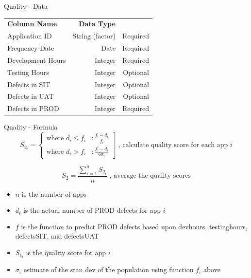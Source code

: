 \begin{frame}{Quality - Data}
    
    \begin{tabular}{l | r | r}
    \textbf{Column Name} & \textbf{Data Type} &  \\
    
    Application ID & String (factor) & Required \\
    Frequency Date & Date & Required \\
    Development Hours & Integer & Required \\
    Testing Hours & Integer & Optional \\ 
    Defects in SIT & Integer & Optional \\ 
    Defects in UAT & Integer  & Optional \\ 
    Defects in PROD & Integer  & Required \\
    \end{tabular}
\end{frame}

\begin{frame}{Quality - Formula}
    \begin{displaymath}
       S_{2_i} = \left\{
         \begin{array}{lr}
           \text{where } d_i \leq f_i & :  \frac{f_i - d_i}{f_i}  \\
           \text{where } d_i > f_i  & : \frac{f_i-d_i }{6\sigma_i}
         \end{array}
       \right] \text{   , calculate quality score for each app $i$}
    \end{displaymath} 

    \[
        S_{2} = \frac{\sum^n_{i=1} S_{2_i}}{n} \text{   , average the quality scores}
    \]
    \begin{itemize}
        \item $n$ is the number of apps
        \item $d_i$ is the actual number of PROD defects for app $i$
        \item $f$ is the function to predict PROD defects based upon devhours, testinghours, defectsSIT,
            and defectsUAT
        \item $S_{1_i}$ is the quality score for app $i$
        \item $\sigma_i$ estimate of the stan dev of the population using function $f_i$ above
    \end{itemize}
    
\end{frame}

